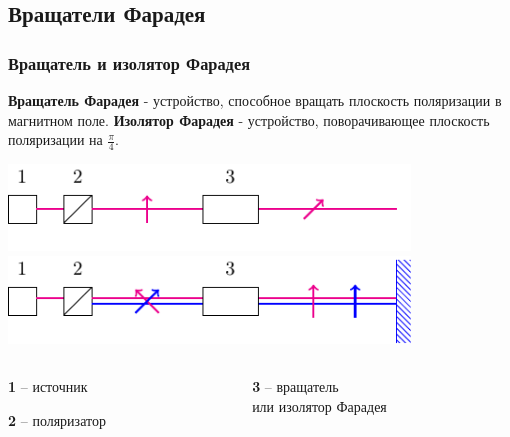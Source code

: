 \documentclass[10pt,pdf,hyperref={unicode}, dvipsnames, handout]{beamer}
\begin{document}
\begin{frame}[t]
	\subsection{Вращатели Фарадея}
	\frametitle{Вращатель и изолятор Фарадея}
	\textbf{Вращатель Фарадея} - устройство, способное вращать плоскость поляризации в магнитном поле. \textbf{Изолятор Фарадея} - устройство, поворачивающее плоскость поляризации на $\frac{\pi}{4}$. 
	\begin{center}
		\includegraphics[width=0.8\textwidth]{img/rot}\\
		\includegraphics[width=0.8\textwidth]{img/zerc}
	\end{center}
	\begin{columns}
		\hspace{2.5cm}
		\begin{column}{0.3\textwidth}
			
			\textbf{1} -- источник
			
			\textbf{2} -- поляризатор
			
		\end{column}
		\hspace{1.6cm}
		\begin{column}{0.7\textwidth}
			
			\textbf{3} -- вращатель\\
			или изолятор Фарадея
		\end{column}
	\end{columns}
	
	
	
\end{frame}
\end{document}
